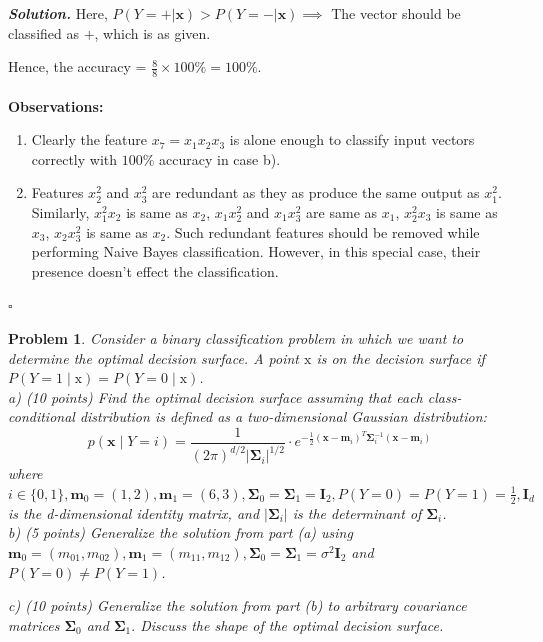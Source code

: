 \documentclass[8pt]{article}
\newtheorem{problem}{Problem}
\newenvironment{solution}[1][\it{Solution}]{\textbf{#1. } }{$\square$}
\begin{document}
\begin{solution}
Here, $P(Y = + | \boldsymbol{x}) > P(Y = - | \boldsymbol{x}) \implies$ The vector should be classified as $+$, which is as given.

Hence, the accuracy = $\frac{8}{8} \times 100 \% = 100 \%$.\\\\

\textbf{Observations:}\\

\begin{enumerate}
\item Clearly the feature $x_7 = x_1x_2x_3$ is alone enough to classify input vectors correctly with $100 \%$ accuracy in case b).
\item Features $x_2^2$ and $x_3^2$ are redundant as they as produce the same output as $x_1^2$. Similarly, $x_1^2x_2$ is same as $x_2$, $x_1x_2^2$ and $x_1x_3^2$ are same as $x_1$, $x_2^2x_3$ is same as $x_3$, $x_2x_3^2$ is same as $x_2$. Such redundant features should be removed while performing Naive Bayes classification. However, in this special case, their presence doesn't effect the classification.
\end{enumerate}

\end{solution}



\begin{problem}
Consider a binary classification problem in which we want to determine the optimal decision surface. A point $\mathrm{x}$ is on the decision surface if $P(Y=1 \mid \mathrm{x})=P(Y=0 \mid \mathrm{x})$.\\

a) (10 points) Find the optimal decision surface assuming that each class-conditional distribution is defined as a two-dimensional Gaussian distribution:
$$
p(\mathbf{x} \mid Y=i)=\frac{1}{(2 \pi)^{d / 2}\left|\boldsymbol{\Sigma}_{i}\right|^{1 / 2}} \cdot e^{-\frac{1}{2}\left(\mathbf{x}-\mathbf{m}_{i}\right)^{T} \boldsymbol{\Sigma}_{i}^{-1}\left(\mathbf{x}-\mathbf{m}_{i}\right)}
$$
where $i \in\{0,1\}, \mathbf{m}_{0}=(1,2), \mathbf{m}_{1}=(6,3), \mathbf{\Sigma}_{0}=\mathbf{\Sigma}_{1}=\mathbf{I}_{2}, P(Y=0)=P(Y=1)=\frac{1}{2}, \mathbf{I}_{d}$ is the d-dimensional identity matrix, and $\left|\boldsymbol{\Sigma}_{i}\right|$ is the determinant of $\boldsymbol{\Sigma}_{i}$.\\

b) (5 points) Generalize the solution from part (a) using $\mathbf{m}_{0}=\left(m_{01}, m_{02}\right), \mathbf{m}_{1}=\left(m_{11}, m_{12}\right), \mathbf{\Sigma}_{0}=\mathbf{\Sigma}_{1}= \sigma^{2} \mathbf{I}_{2}$ and $P(Y=0) \neq P(Y=1)$.

c) (10 points) Generalize the solution from part (b) to arbitrary covariance matrices $\boldsymbol{\Sigma}_{0}$ and $\boldsymbol{\Sigma}_{1} .$ Discuss the shape of the optimal decision surface.
\end{problem}
\end{document}
